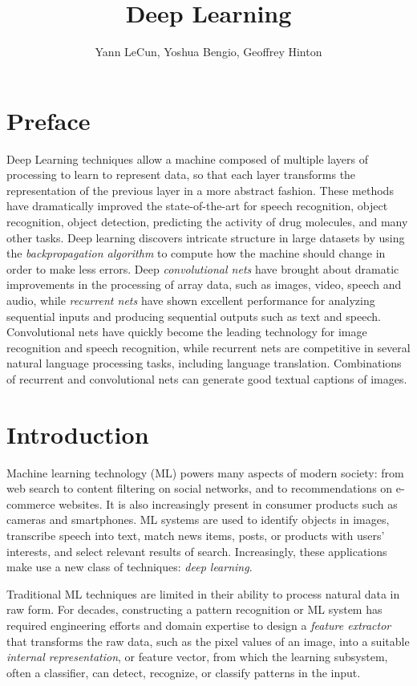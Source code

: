 \documentclass[10pts]{article}
\title{Deep Learning}
\author{Yann LeCun, Yoshua Bengio, Geoffrey Hinton}
\begin{document}
\maketitle

\section{Preface}

Deep Learning techniques allow a machine composed of multiple layers
of processing to learn to represent data, so that each layer transforms
the representation of the previous layer in a more abstract
fashion. These methods have dramatically improved the state-of-the-art
for speech recognition, object recognition, object detection,
predicting the activity of drug molecules, and many other tasks. Deep
learning discovers intricate structure in large datasets by using the
{\em backpropagation algorithm} to compute how the machine should
change in order to make less errors.  Deep {\em convolutional nets}
have brought about dramatic improvements in the processing of array
data, such as images, video, speech and audio, while {\em recurrent
  nets} have shown excellent performance for analyzing sequential
inputs and producing sequential outputs such as text and
speech. Convolutional nets have quickly become the leading technology for image
recognition and speech recognition, while recurrent nets are
competitive in several natural language processing tasks, including
language translation. Combinations of recurrent and convolutional nets
can generate good textual captions of images.

\section{Introduction}

Machine learning technology (ML) powers many aspects of modern
society: from web search to content filtering on social networks, and
to recommendations on e-commerce websites. It is also increasingly
present in consumer products such as cameras and smartphones. ML
systems are used to identify objects in images, transcribe speech into
text, match news items, posts, or products with users' interests, and
select relevant results of search. Increasingly, these applications
make use a new class of techniques: {\em deep learning}.

Traditional ML techniques are limited in their ability to process
natural data in raw form. For decades, constructing a pattern
recognition or ML system has required engineering efforts and domain
expertise to design a {\em feature extractor} that transforms the raw
data, such as the pixel values of an image, into a suitable {\em
  internal representation}, or feature vector, from which the learning
subsystem, often a classifier, can detect, recognize, or classify
patterns in the input.
\end{document}
